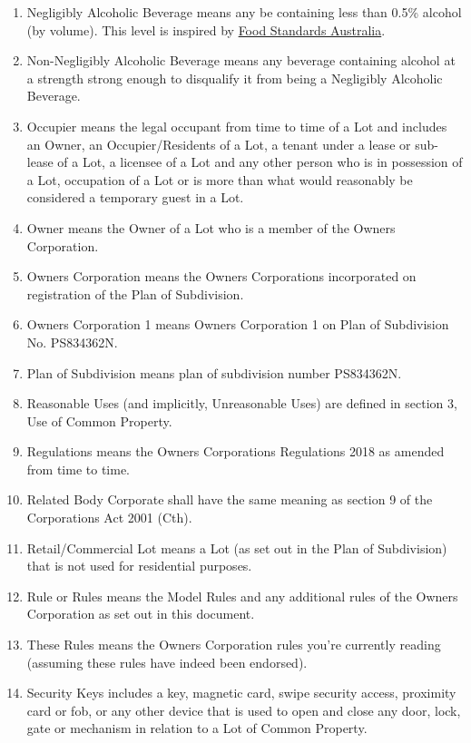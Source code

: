\documentclass{article}
\begin{document}
\begin{enumerate}[label=\arabic*.]
\begin{enumerate}[label=\arabic{enumi}.\arabic*.]
\begin{enumerate}[label=(\arabic*)]
\item Negligibly Alcoholic Beverage means any be containing less than 0.5\% alcohol (by volume). This level is inspired by \href{https://www.foodstandards.gov.au/consumer/labelling/Labelling-of-alcoholic-beverages}{Food Standards Australia}.
\item Non-Negligibly Alcoholic Beverage means any beverage containing alcohol at a strength strong enough to disqualify it from being a Negligibly Alcoholic Beverage.
\item  Occupier means the legal occupant from time to time of a Lot and includes an Owner, an Occupier/Residents of a Lot, a tenant under a lease or sub-lease of a Lot, a licensee of a Lot and any other person who is in possession of a Lot, occupation of a Lot or is more than what would reasonably be considered a temporary guest in a Lot.

\item  Owner means the Owner of a Lot who is a member of the Owners Corporation.

\item  Owners Corporation means the Owners Corporations incorporated on registration of the Plan of Subdivision.

\item  Owners Corporation 1 means Owners Corporation 1 on Plan of Subdivision No. PS834362N.

\item  Plan of Subdivision means plan of subdivision number PS834362N.

\item Reasonable Uses (and implicitly, Unreasonable Uses) are defined in section 3, Use of Common Property.

\item  Regulations means the Owners Corporations Regulations 2018 as amended from time to time.

\item  Related Body Corporate shall have the same meaning as section 9 of the Corporations Act 2001 (Cth).

\item  Retail/Commercial Lot means a Lot (as set out in the Plan of Subdivision) that is not used for residential purposes.

\item  Rule or Rules means the Model Rules and any additional rules of the Owners Corporation as set out in this document.

\item These Rules means the Owners Corporation rules you're currently reading (assuming these rules have indeed been endorsed).
\item  Security Keys includes a key, magnetic card, swipe security access, proximity card or fob, or any other device that is used to open and close any door, lock, gate or mechanism in relation to a Lot of Common Property.


\end{enumerate}
\end{enumerate}
\end{enumerate}
\end{document}
